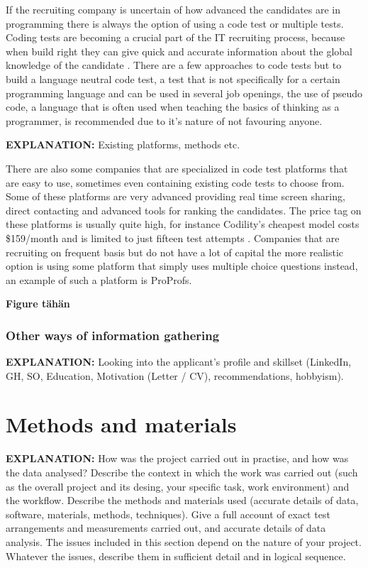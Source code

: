 \documentclass[11pt,a4paper,oneside,article]{memoir}
\begin{document}
If the recruiting company is uncertain of how advanced the candidates are in programming there is always the option of using a code test or multiple tests. Coding tests are becoming a crucial part of the IT recruiting process, because when build right they can give quick and accurate information about the global knowledge of the candidate \cite{winter:blog}. There are a few approaches to code tests but to build a language neutral code test, a test that is not specifically for a certain programming language and can be used in several job openings, the use of pseudo code, a language that is often used when teaching the basics of thinking as a programmer, is recommended due to it's nature of not favouring anyone.

\textbf{EXPLANATION:} Existing platforms, methods etc.

There are also some companies that are specialized in code test platforms that are easy to use, sometimes even containing existing code tests to choose from. Some of these platforms are very advanced providing real time screen sharing, direct contacting and advanced tools for ranking the candidates. The price tag on these platforms is usually quite high, for instance Codility's cheapest model costs \$159/month and is limited to just fifteen test attempts \cite{codility}. Companies that are recruiting on frequent basis but do not have a lot of capital the more realistic option is using some platform that simply uses multiple choice questions instead, an example of such a platform is ProProfs\cite{proprofs}.



\textbf{Figure tähän}



\subsection{Other ways of information gathering}
\textbf{EXPLANATION:} Looking into the applicant’s profile and skillset (LinkedIn, GH, SO, Education, Motivation (Letter / CV), recommendations, hobbyism).
\chapter{Methods and materials}
\textbf{EXPLANATION:} How was the project carried out in practise, and how was the data analysed? Describe the context in which the work was carried out (such as the overall project and its desing, your specific task, work environment) and the workflow. Describe the methods and materials used (accurate details of data, software, materials, methods, techniques). Give a full account of exact test arrangements and measurements carried out, and accurate details of data analysis. The issues included in this section depend on the nature of your project. Whatever the issues, describe them in sufficient detail and in logical sequence.
\end{document}
